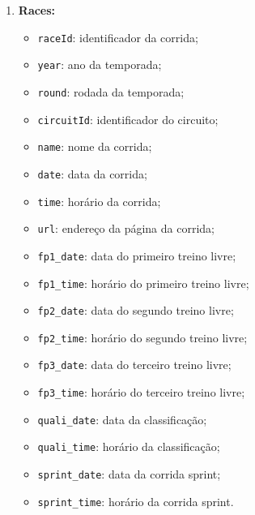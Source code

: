 \documentclass[12pt]{article}
\begin{document}
\begin{enumerate}
    \item \textbf{Races:}
    \begin{itemize}
        \item \texttt{raceId}: identificador da corrida;
        \item \texttt{year}: ano da temporada;
        \item \texttt{round}: rodada da temporada;
        \item \texttt{circuitId}: identificador do circuito;
        \item \texttt{name}: nome da corrida;
        \item \texttt{date}: data da corrida;
        \item \texttt{time}: horário da corrida;
        \item \texttt{url}: endereço da página da corrida;
        \item \texttt{fp1\_date}: data do primeiro treino livre;
        \item \texttt{fp1\_time}: horário do primeiro treino livre;
        \item \texttt{fp2\_date}: data do segundo treino livre;
        \item \texttt{fp2\_time}: horário do segundo treino livre;
        \item \texttt{fp3\_date}: data do terceiro treino livre;
        \item \texttt{fp3\_time}: horário do terceiro treino livre;
        \item \texttt{quali\_date}: data da classificação;
        \item \texttt{quali\_time}: horário da classificação;
        \item \texttt{sprint\_date}: data da corrida sprint;
        \item \texttt{sprint\_time}: horário da corrida sprint.
    \end{itemize}


\end{enumerate}
\end{document}
